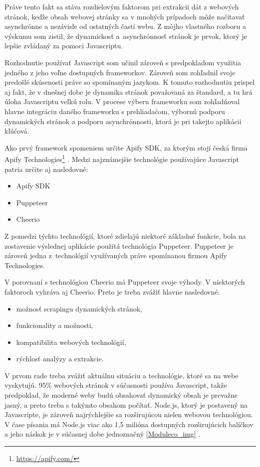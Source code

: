 Práve tento fakt sa stáva rozdielovým faktorom pri extrakcii dát z webových stránok, keďže obsah webovej stránky sa v mnohých prípadoch môže načítavať asynchrónne a nezávisle od ostatných častí webu. Z môjho vlastného rozboru a výskumu som zistil, že dynamickosť a~asynchrónnosť stránok je prvok, ktorý je lepšie zvládaný za pomoci Javascriptu.

Rozhodnutie používať Javascript som učinil zároveň s predpokladom využitia jedného z jeho voľne dostupných frameworkov. Zároveň som zohľadnil svoje predošlé skúsenosti práve so spomínaným jazykom. K tomuto rozhodnutiu prispel aj fakt, že v dnešnej dobe je dynamika stránok považovaná za štandard, a tu hrá úloha Javascriptu veľkú rolu. V procese výberu frameworku som zohľadňoval hlavne integráciu daného frameworku s prehliadačom, výbornú podporu dynamických stránok a podporu asynchrónnosti, ktorá je pri takejto aplikácii kľúčová.

Ako prvý framework spomeniem určite Apify SDK, za ktorým stojí česká firma Apify Technologies\footnote{{\url{https://apify.com/}}} \cite{JanCurna:online}. Medzi najznámejšie technológie používajúce Javascript patria určite aj nasledovné:

\begin{itemize}
    \item {Apify SDK}
    \item {Puppeteer}
    \item {Cheerio}
\end{itemize}

Z pomedzi týchto technológií, ktoré zdieľajú niektoré základné funkcie, bola na zostavenie výslednej aplikácie použitá technológia Puppeteer. Puppeteer je zároveň jedna z~technológií využívaných práve spomínanou firmou Apify Technologies. 

V porovnaní s technológiou Cheerio má Puppeteer svoje výhody. V niektorých faktoroch vyhráva aj Cheerio. Preto je treba zvážiť hlavne nasledovné:

\begin{itemize}
    \item možnosť scrapingu dynamických stránok,
    \item funkcionality a možnosti,
    \item kompatibilita webových technológií,
    \item rýchlosť analýzy a extrakcie.
\end{itemize}

V prvom rade treba zvážiť aktuálnu situáciu a technológie, ktoré sa na webe vyskytujú. 95\% webových stránok v súčasnosti používa Javascript, takže predpoklad, že moderné weby budú obsahovať dynamický obsah je prevažne jasný, a preto treba s takýmto obsahom počítať. Node.js, ktorý je postavený na Javascripte, je zároveň najrýchlejšie sa rozširujúcou nielen webovou technológiou. V čase písania má Node.js viac ako 1,5 milióna dostupných rozširujúcich balíčkov a jeho náskok je v súčasnej dobe jednoznačný \ref{Moduleco_img} \cite{HowPopular}. 


